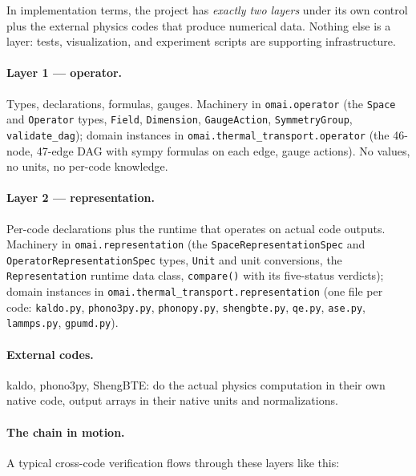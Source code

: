 \documentclass[11pt,a4paper]{article}
\begin{document}
In implementation terms, the project has \emph{exactly two layers} under its
own control plus the external physics codes that produce numerical data.
Nothing else is a layer: tests, visualization, and experiment scripts are
supporting infrastructure.

\paragraph{Layer 1 --- operator.} Types, declarations, formulas, gauges.
Machinery in \texttt{omai.operator} (the \texttt{Space} and
\texttt{Operator} types, \texttt{Field}, \texttt{Dimension},
\texttt{GaugeAction}, \texttt{SymmetryGroup}, \texttt{validate\_dag});
domain instances in \texttt{omai.thermal\_transport.operator} (the
46-node, 47-edge DAG with sympy formulas on each edge, gauge actions).
No values, no units, no per-code knowledge.

\paragraph{Layer 2 --- representation.} Per-code declarations plus the
runtime that operates on actual code outputs. Machinery in
\texttt{omai.representation} (the \texttt{SpaceRepresentationSpec} and
\texttt{OperatorRepresentationSpec} types, \texttt{Unit} and unit conversions,
the \texttt{Representation} runtime data class, \texttt{compare()} with
its five-status verdicts); domain instances in
\texttt{omai.thermal\_transport.representation} (one file per code:
\texttt{kaldo.py}, \texttt{phono3py.py}, \texttt{phonopy.py},
\texttt{shengbte.py}, \texttt{qe.py}, \texttt{ase.py}, \texttt{lammps.py},
\texttt{gpumd.py}).

\paragraph{External codes.} kaldo, phono3py, ShengBTE: do the actual
physics computation in their own native code, output arrays in their
native units and normalizations.

\paragraph{The chain in motion.} A typical cross-code verification flows
through these layers like this:
\end{document}
